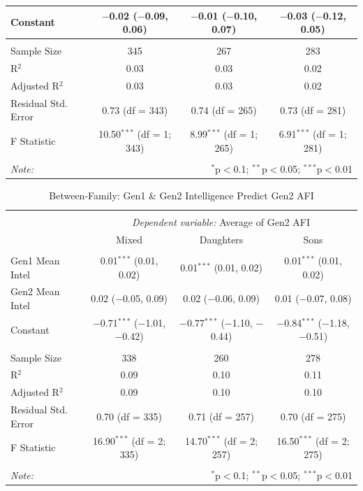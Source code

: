 \documentclass[a4paper,man,apacite,natbib,12pt,longtable]{apa6}\usepackage[]{graphicx}\usepackage[]{color}
\begin{document}
\begin{landscape}
\begin{longtable}{@{\extracolsep{5pt}}lccc}
  Constant & $-$0.02 ($-$0.09, 0.06) & $-$0.01 ($-$0.10, 0.07) & $-$0.03 ($-$0.12, 0.05) \\ 
 \hline \\[-1.8ex] 
Sample Size & 345 & 267 & 283 \\ 
R$^{2}$ & 0.03 & 0.03 & 0.02 \\ 
Adjusted R$^{2}$ & 0.03 & 0.03 & 0.02 \\ 
Residual Std. Error & 0.73 (df = 343) & 0.74 (df = 265) & 0.73 (df = 281) \\ 
F Statistic & 10.50$^{***}$ (df = 1; 343) & 8.99$^{***}$ (df = 1; 265) & 6.91$^{***}$ (df = 1; 281) \\ 
\hline 
\hline \\[-1.8ex] 
\textit{Note:}  & \multicolumn{3}{r}{$^{*}$p$<$0.1; $^{**}$p$<$0.05; $^{***}$p$<$0.01} \\ 
  \end{longtable}\pagebreak
  \begin{longtable}{@{\extracolsep{5pt}}lccc} 
  \caption{Between-Family: Gen1 \& Gen2 Intelligence Predict Gen2 AFI} \label{table_Mean_Joint_Intelligence_Mean_Child_AFI_10}
  \\[-1.8ex]\hline 
  \hline \\[-3.8ex] 
  & \multicolumn{3}{c}{\textit{Dependent variable:} Average of Gen2 AFI} \\ 
  \cline{2-4}
 & Mixed & Daughters & Sons \\ 
\hline \\[-1.8ex] 
 Gen1 Mean Intel & 0.01$^{***}$ (0.01, 0.02) & 0.01$^{***}$ (0.01, 0.02) & 0.01$^{***}$ (0.01, 0.02) \\ 
  Gen2 Mean Intel & 0.02 ($-$0.05, 0.09) & 0.02 ($-$0.06, 0.09) & 0.01 ($-$0.07, 0.08) \\ 
  Constant & $-$0.71$^{***}$ ($-$1.01, $-$0.42) & $-$0.77$^{***}$ ($-$1.10, $-$0.44) & $-$0.84$^{***}$ ($-$1.18, $-$0.51) \\ 
 \hline \\[-1.8ex] 
Sample Size & 338 & 260 & 278 \\ 
R$^{2}$ & 0.09 & 0.10 & 0.11 \\ 
Adjusted R$^{2}$ & 0.09 & 0.10 & 0.10 \\ 
Residual Std. Error & 0.70 (df = 335) & 0.71 (df = 257) & 0.70 (df = 275) \\ 
F Statistic & 16.90$^{***}$ (df = 2; 335) & 14.70$^{***}$ (df = 2; 257) & 16.50$^{***}$ (df = 2; 275) \\ 
\hline 
\hline \\[-1.8ex] 
\textit{Note:}  & \multicolumn{3}{r}{$^{*}$p$<$0.1; $^{**}$p$<$0.05; $^{***}$p$<$0.01} \\ 
  \end{longtable}\pagebreak

\end{landscape}
\end{document}
